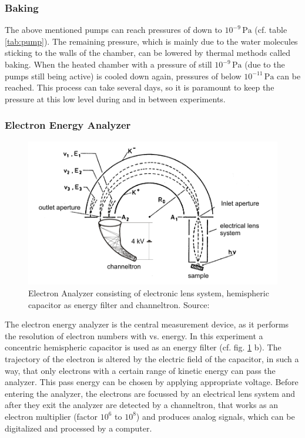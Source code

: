 \documentclass[a4paper]{scrartcl}
\numberwithin{equation}{section}
\numberwithin{figure}{section}
\numberwithin{table}{section}
\begin{document}
\subsubsection*{Baking}
The above mentioned pumps can reach pressures of down to $10^{-9}\,\text{Pa}$ (cf. table \ref{tab:pump}). The remaining pressure, which is mainly due to the water molecules sticking to the walls of the chamber, can be lowered by thermal methods called baking. When the heated chamber with a pressure of still $10^{-9}\,\text{Pa}$ (due to the pumps still being active) is cooled down again, pressures of below $10^{-11}\,\text{Pa}$ can be reached. This process can take several days, so it is paramount to keep the pressure at this low level during and in between experiments.

\clearpage
\subsubsection{Electron Energy Analyzer}

\begin{figure}
  \centering
   	\includegraphics[width=\linewidth]{img/channeltron.png}
 \caption{\small Electron Analyzer consisting of electronic lens system, hemispheric capacitor as energy filter and channeltron. Source: \cite{gop} }
        \label{fig:analyzer}
\end{figure}
The electron energy analyzer is the central measurement device, as it performs the resolution of electron numbers with vs. energy. In this experiment a concentric hemispheric capacitor is used as an energy filter (cf. fig. \ref{fig:analyzer} b). The trajectory of the electron is altered by the electric field of the capacitor, in such a way, that only electrons with a certain range of kinetic energy can pass the analyzer. This pass energy can be chosen by applying appropriate voltage. Before entering the analyzer, the electrons are focussed by an electrical lens system and after they exit the analyzer are detected by a channeltron, that works as an electron multiplier (factor $10^6$ to $10^8$) and produces analog signals, which can be digitalized and processed by a computer. 
\end{document}
